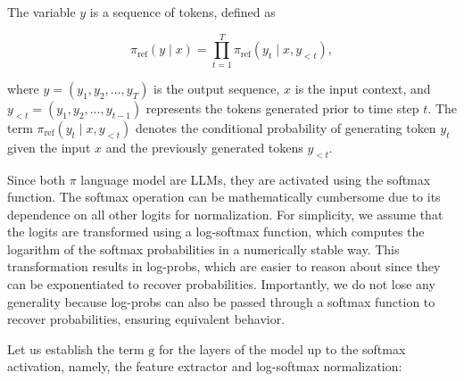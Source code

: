 \documentclass[twoside,11pt]{article}
\begin{document}
The variable $y$ is a sequence of tokens, defined as

\begin{equation}
  \label{eq:joint}
  \pi_\mathrm{ref}(y \mid x) = \prod_{t=1}^T \pi_\mathrm{ref}(y_t \mid x, y_{<t}),
\end{equation}

where \(y = (y_1, y_2, \ldots, y_T)\) is the output sequence, 
\(x\) is the input context, and \(y_{<t} = (y_1, y_2, \ldots, y_{t-1})\) 
represents the tokens generated prior to time step \(t\). The term 
\(\pi_\mathrm{ref}(y_t \mid x, y_{<t})\) denotes the conditional 
probability of generating token \(y_t\) given the input \(x\) and 
the previously generated tokens \(y_{<t}\).

Since both $\pi$ language model are LLMs, they are activated
using the softmax function. 
The softmax operation can be mathematically cumbersome 
due to its dependence on all other logits for normalization. 
For simplicity, we assume that the logits are transformed 
using a log-softmax function, which computes the logarithm 
of the softmax probabilities in a numerically stable way. 
This transformation results in log-probs, 
which are easier to reason about since they 
can be exponentiated to recover probabilities. 
Importantly, we do not lose any generality because 
log-probs can also be passed through a softmax 
function to recover probabilities, ensuring equivalent behavior.

Let us establish the term $\mathrm{g}$ for the layers of the model up to the softmax
activation, namely, the feature extractor and log-softmax normalization: 
\end{document}
